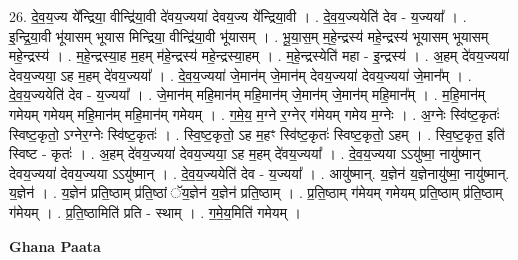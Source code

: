 \documentclass[17pt]{extarticle}
\begin{document}
26. दे॒व॒य॒ज्य ये᳚न्द्रिया॒ वीन्द्रि॑या॒वी दे॑वय॒ज्यया॑ देवय॒ज्य ये᳚न्द्रिया॒वी । . दे॒व॒य॒ज्ययेति॑ देव - य॒ज्यया᳚ । . इ॒न्द्रि॒या॒वी भू॑यासम् भूयास मिन्द्रिया॒ वीन्द्रि॑या॒वी भू॑यासम् । . भू॒या॒स॒म् म॒हे॒न्द्रस्य॑ महे॒न्द्रस्य॑ भूयासम् भूयासम् महे॒न्द्रस्य॑ । . म॒हे॒न्द्रस्या॒ह म॒हम् म॑हे॒न्द्रस्य॑ महे॒न्द्रस्या॒हम् । . म॒हे॒न्द्रस्येति॑ महा - इ॒न्द्रस्य॑ । . अ॒हम् दे॑वय॒ज्यया॑ देवय॒ज्यया॒ ऽह म॒हम् दे॑वय॒ज्यया᳚ । . दे॒व॒य॒ज्यया॑ जे॒मान॑म् जे॒मान॑म् देवय॒ज्यया॑ देवय॒ज्यया॑ जे॒मान᳚म् । . दे॒व॒य॒ज्ययेति॑ देव - य॒ज्यया᳚ । . जे॒मान॑म् महि॒मान॑म् महि॒मान॑म् जे॒मान॑म् जे॒मान॑म् महि॒मान᳚म् । . म॒हि॒मान॑म् गमेयम् गमेयम् महि॒मान॑म् महि॒मान॑म् गमेयम् । . ग॒मे॒य॒ म॒ग्ने र॒ग्नेर् ग॑मेयम् गमेय म॒ग्नेः । . अ॒ग्नेः स्वि॑ष्ट॒कृतः॑ स्विष्ट॒कृतो॒ ऽग्नेर॒ग्नेः स्वि॑ष्ट॒कृतः॑ । . स्वि॒ष्ट॒कृतो॒ ऽह म॒हꣳ स्वि॑ष्ट॒कृतः॑ स्विष्ट॒कृतो॒ ऽहम् । . स्वि॒ष्ट॒कृत॒ इति॑ स्विष्ट - कृतः॑ । . अ॒हम् दे॑वय॒ज्यया॑ देवय॒ज्यया॒ ऽह म॒हम् दे॑वय॒ज्यया᳚ । . दे॒व॒य॒ज्यया ऽऽयु॑ष्मा॒ नायु॑ष्मान् देवय॒ज्यया॑ देवय॒ज्यया ऽऽयु॑ष्मान् । . दे॒व॒य॒ज्ययेति॑ देव - य॒ज्यया᳚ । . आयु॑ष्मान्. य॒ज्ञेन॑ य॒ज्ञेनायु॑ष्मा॒ नायु॑ष्मान्. य॒ज्ञेन॑ । . य॒ज्ञेन॑ प्रति॒ष्ठाम् प्र॑ति॒ष्ठां ॅय॒ज्ञेन॑ य॒ज्ञेन॑ प्रति॒ष्ठाम् । . प्र॒ति॒ष्ठाम् ग॑मेयम् गमेयम् प्रति॒ष्ठाम् प्र॑ति॒ष्ठाम् ग॑मेयम् । . प्र॒ति॒ष्ठामिति॑ प्रति - स्थाम् । . ग॒मे॒य॒मिति॑ गमेयम् । \newline

\textbf{Ghana Paata } \newline
\end{document}
